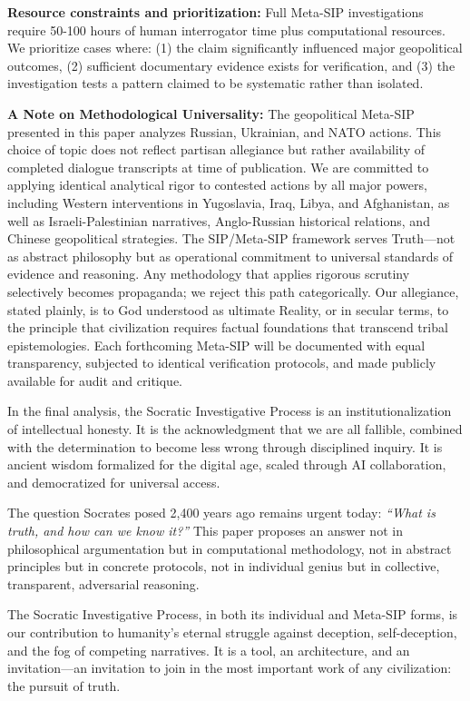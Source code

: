 \documentclass[11pt,a4paper]{article}
\begin{document}
\textbf{Resource constraints and prioritization:} Full Meta-SIP 
investigations require 50-100 hours of human interrogator time plus 
computational resources. We prioritize cases where: (1) the claim 
significantly influenced major geopolitical outcomes, (2) sufficient 
documentary evidence exists for verification, and (3) the investigation 
tests a pattern claimed to be systematic rather than isolated.

\vspace{0.5em}
\noindent \textbf{A Note on Methodological Universality:} The geopolitical Meta-SIP presented in this paper analyzes Russian, Ukrainian, and NATO actions. This choice of topic does not reflect partisan allegiance but rather availability of completed dialogue transcripts at time of publication. We are committed to applying identical analytical rigor to contested actions by all major powers, including Western interventions in Yugoslavia, Iraq, Libya, and Afghanistan, as well as Israeli-Palestinian narratives, Anglo-Russian historical relations, and Chinese geopolitical strategies. The SIP/Meta-SIP framework serves Truth—not as abstract philosophy but as operational commitment to universal standards of evidence and reasoning. Any methodology that applies rigorous scrutiny selectively becomes propaganda; we reject this path categorically. Our allegiance, stated plainly, is to God understood as ultimate Reality, or in secular terms, to the principle that civilization requires factual foundations that transcend tribal epistemologies. Each forthcoming Meta-SIP will be documented with equal transparency, subjected to identical verification protocols, and made publicly available for audit and critique.

In the final analysis, the Socratic Investigative Process is an institutionalization of intellectual honesty. It is the acknowledgment that we are all fallible, combined with the determination to become less wrong through disciplined inquiry. It is ancient wisdom formalized for the digital age, scaled through AI collaboration, and democratized for universal access.

The question Socrates posed 2,400 years ago remains urgent today: \textit{``What is truth, and how can we know it?''} This paper proposes an answer not in philosophical argumentation but in computational methodology, not in abstract principles but in concrete protocols, not in individual genius but in collective, transparent, adversarial reasoning.

The Socratic Investigative Process, in both its individual and Meta-SIP forms, is our contribution to humanity's eternal struggle against deception, self-deception, and the fog of competing narratives. It is a tool, an architecture, and an invitation---an invitation to join in the most important work of any civilization: the pursuit of truth.
\end{document}
